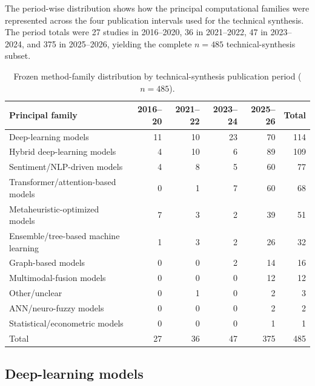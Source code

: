 \documentclass[12pt]{article}
\numberwithin{equation}{section}
\begin{document}
The period-wise distribution shows how the principal computational families
were represented across the four publication intervals used for the technical
synthesis. The period totals were 27 studies in 2016--2020, 36 in 2021--2022,
47 in 2023--2024, and 375 in 2025--2026, yielding the complete \(n=485\)
technical-synthesis subset.

\begin{table}[!htbp]
\centering\footnotesize
\caption{Frozen method-family distribution by technical-synthesis publication period ($n=485$).}
\label{tab:supp-family-period-new}
\setlength{\tabcolsep}{3.5pt}
\begin{tabularx}{\linewidth}{@{}>{\RaggedRight\arraybackslash}Xrrrrr@{}}
\toprule
Principal family & 2016--20 & 2021--22 & 2023--24 & 2025--26 & Total \\
\midrule
Deep-learning models & 11 & 10 & 23 & 70 & 114 \\
Hybrid deep-learning models & 4 & 10 & 6 & 89 & 109 \\
Sentiment/NLP-driven models & 4 & 8 & 5 & 60 & 77 \\
Transformer/attention-based models & 0 & 1 & 7 & 60 & 68 \\
Metaheuristic-optimized models & 7 & 3 & 2 & 39 & 51 \\
Ensemble/tree-based machine learning & 1 & 3 & 2 & 26 & 32 \\
Graph-based models & 0 & 0 & 2 & 14 & 16 \\
Multimodal-fusion models & 0 & 0 & 0 & 12 & 12 \\
Other/unclear & 0 & 1 & 0 & 2 & 3 \\
ANN/neuro-fuzzy models & 0 & 0 & 0 & 2 & 2 \\
Statistical/econometric models & 0 & 0 & 0 & 1 & 1 \\
\midrule
Total & 27 & 36 & 47 & 375 & 485 \\
\bottomrule\end{tabularx}
\end{table}
\FloatBarrier

\subsection{Deep-learning models}
\label{sec:supp-deep-learning}
\end{document}
